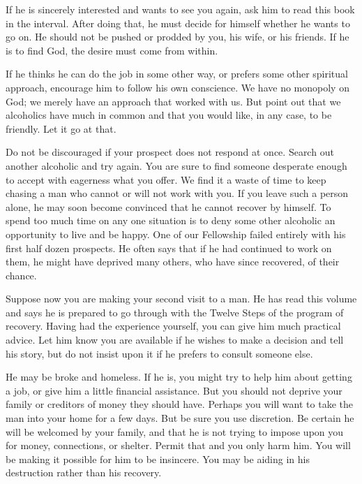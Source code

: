 \begin{biblechapter}
If he is sincerely interested and wants to see you again, ask him to read this book in the interval.  After doing that, he must decide for himself whether he wants to go on.  He should not be pushed or prodded by you, his wife, or his friends.  If he is to find God, the desire must come from within.

If he thinks he can do the job in some other way, or prefers some other spiritual approach, encourage him to follow his own conscience.  We have no monopoly on God; we merely have an approach that worked with us.  But point out that we alcoholics have much in common and that you would like, in any case, to be friendly.  Let it go at that.

Do not be discouraged if your prospect does not respond at once.  Search out another alcoholic and try again.  You are sure to find someone desperate enough to accept with eagerness what you offer.  We find it a waste of time to keep chasing a man who cannot or will not work with you.  If you leave such a person alone, he may soon become convinced that he cannot recover by himself.  To spend too much time on any one situation is to deny some other alcoholic an opportunity to live and be happy.  One of our Fellowship failed entirely with his first half dozen prospects.  He often says that if he had continued to work on them, he might have deprived many others, who have since recovered, of their chance.

Suppose now you are making your second visit to a man.  He has read this volume and says he is prepared to go through with the Twelve Steps of the program of recovery.  Having had the experience yourself, you can give him much practical advice.  Let him know you are available if he wishes to make a decision and tell his story, but do not insist upon it if he prefers to consult someone else.

He may be broke and homeless.  If he is, you might try to help him about getting a job, or give him a little financial assistance.  But you should not deprive your family or creditors of money they should have.  Perhaps you will want to take the man into your home for a few days.  But be sure you use discretion.  Be certain he will be welcomed by your family, and that he is not trying to impose upon you for money, connections, or shelter.  Permit that and you only harm him.  You will be making it possible for him to be insincere.  You may be aiding in his destruction rather than his recovery.


\end{biblechapter}
